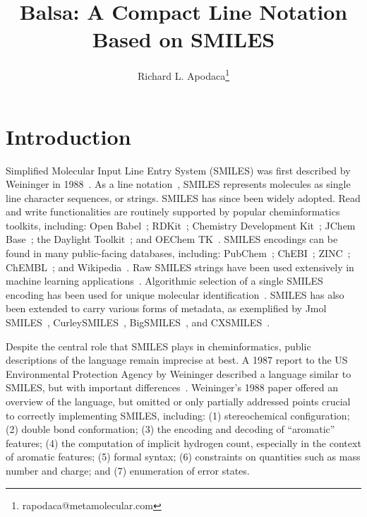 \documentclass{article}
\begin{document}
\lstset{basicstyle=\ttfamily,breaklines=true}


\title{Balsa: A Compact Line Notation Based on SMILES}
\author{Richard L. Apodaca\thanks{rapodaca@metamolecular.com}}

\maketitle

\section*{Introduction}

Simplified Molecular Input Line Entry System (SMILES) was first described by Weininger in 1988~\cite{weininger:1988}. As a line notation~\cite{wiswesser:1968}, SMILES represents molecules as single line character sequences, or strings. SMILES has since been widely adopted. Read and write functionalities are routinely supported by popular cheminformatics toolkits, including: Open Babel~\cite{oBoyle:2011}; RDKit~\cite{rdkit}; Chemistry Development Kit~\cite{steinbeck:2003}; JChem Base~\cite{jchemBase}; the Daylight Toolkit~\cite{daylightToolkit}; and OEChem TK~\cite{oetk}. SMILES encodings can be found in many public-facing databases, including: PubChem~\cite{kim:2016}; ChEBI~\cite{degtyarenko:2007}; ZINC~\cite{irwin:2005}; ChEMBL~\cite{gaulton:2012}; and Wikipedia~\cite{wikipediaCAS}. Raw SMILES strings have been used extensively in machine learning applications~\cite{sousa:2021}. Algorithmic selection of a single SMILES encoding has been used for unique molecular identification~\cite{weininger:1989,oBoyle:2012}. SMILES has also been extended to carry various forms of metadata, as exemplified by Jmol SMILES~\cite{hanson:2016}, CurleySMILES~\cite{drefahl:2011}, BigSMILES~\cite{lin:2019}, and CXSMILES~\cite{cxsmiles}.

Despite the central role that SMILES plays in cheminformatics, public descriptions of the language remain imprecise at best. A 1987 report to the US Environmental Protection Agency by Weininger described a language similar to SMILES, but with important differences~\cite{anderson:1987}. Weininger's 1988 paper offered an overview of the language, but omitted or only partially addressed points crucial to correctly implementing SMILES, including: (1) stereochemical configuration; (2) double bond conformation; (3) the encoding and decoding of \enquote{aromatic} features; (4) the computation of implicit hydrogen count, especially in the context of aromatic features; (5) formal syntax; (6) constraints on quantities such as mass number and charge; and (7) enumeration of error states.
\end{document}
